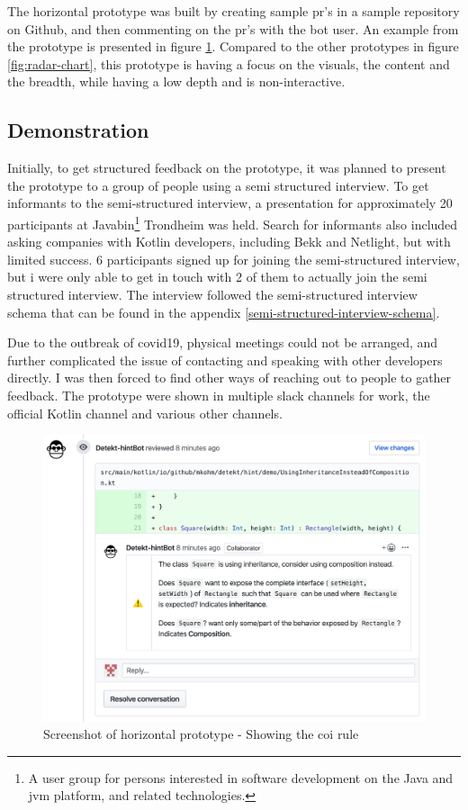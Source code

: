 \documentclass{report}
\begin{document}
The horizontal prototype was built by creating sample \gls{pr}'s in a sample repository on Github\cite{sample-repository}, and then commenting on the \gls{pr}'s with the bot user. An example from the prototype is presented in figure \ref{fig:liskov}. Compared to the other prototypes in figure \ref{fig:radar-chart}, this prototype is having a focus on the visuals, the content and the breadth, while having a low depth and is non-interactive.

\subsection*{Demonstration}
Initially, to get structured feedback on the prototype, it was planned to present the prototype to a group of people using a semi structured interview. To get informants to the semi-structured interview, a presentation for approximately 20 participants at Javabin\footnote{A user group for persons interested in software development on the Java and \gls{jvm} platform, and related technologies.} Trondheim was held. Search for informants also included asking companies with Kotlin developers, including Bekk and Netlight, but with limited success. 6 participants signed up for joining the semi-structured interview, but i were only able to get in touch with 2 of them to actually join the semi structured interview. The interview followed the semi-structured interview schema that can be found in the appendix \ref{semi-structured-interview-schema}.

Due to the outbreak of \gls{covid19}, physical meetings could not be arranged, and further complicated the issue of contacting and speaking with other developers directly. I was then forced to find other ways of reaching out to people to gather feedback. The prototype were shown in multiple slack channels for work, the official Kotlin channel and various other channels.

\begin{figure}[h!]
    \centering
    \includegraphics[width=\textwidth]{../images/demo.png}
    \caption{Screenshot of horizontal prototype - Showing the \gls{coi} rule}
    \label{fig:liskov}
\end{figure}
\end{document}
